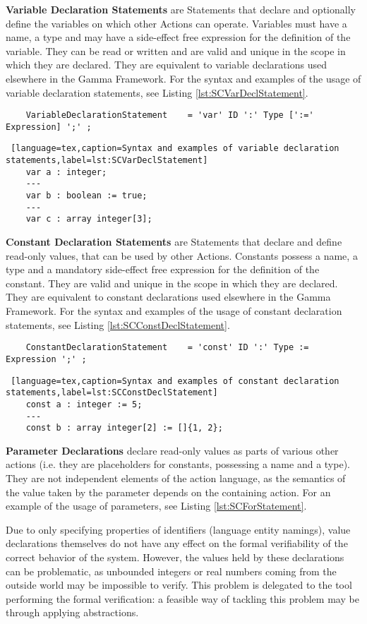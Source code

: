 \bigskip
\textbf{Variable Declaration Statements} are Statements that declare and optionally define the variables on which other Actions can operate. Variables must have a name, a type and may have a side-effect free expression for the definition of the variable. They can be read or written and are valid and unique in the scope in which they are declared. They are equivalent to variable declarations used  elsewhere in the Gamma Framework. For the syntax and examples of the usage of variable declaration statements, see Listing \ref{lst:SCVarDeclStatement}.
\bigskip
\begin{lstlisting}
	VariableDeclarationStatement 	= 'var' ID ':' Type [':=' Expression] ';' ;	
\end{lstlisting}
\begin{lstlisting} [language=tex,caption=Syntax and examples of variable declaration statements,label=lst:SCVarDeclStatement]
	var a : integer;
	---
	var b : boolean := true;
	---
	var c : array integer[3];
\end{lstlisting}

\textbf{Constant Declaration Statements} are Statements that declare and define read-only values, that can be used by other Actions. Constants possess a name, a type and a mandatory side-effect free expression for the definition of the constant. They are valid and unique in the scope in which they are declared. They are equivalent to constant declarations used  elsewhere in the Gamma Framework. For the syntax and examples of the usage of constant declaration statements, see Listing \ref{lst:SCConstDeclStatement}.
\bigskip
\begin{lstlisting}
	ConstantDeclarationStatement 	= 'const' ID ':' Type := Expression ';' ;
\end{lstlisting}
\begin{lstlisting} [language=tex,caption=Syntax and examples of constant declaration statements,label=lst:SCConstDeclStatement]
	const a : integer := 5;
	---
	const b : array integer[2] := []{1, 2}; 
\end{lstlisting}

\textbf{Parameter Declarations} declare read-only values as parts of various other actions (i.e. they are placeholders for constants, possessing a name and a type). They are not independent elements of the action language, as the semantics of the value taken by the parameter depends on the containing action. For an example of the usage of parameters, see Listing \ref{lst:SCForStatement}. 

\bigskip
Due to only specifying properties of identifiers (language entity namings), value declarations themselves do not have any effect on the formal verifiability of the correct behavior of the system. However, the values held by these declarations can be problematic, as unbounded integers or real numbers coming from the outside world may be impossible to verify. This problem is delegated to the tool performing the formal verification: a feasible way of tackling this problem may be through applying abstractions.
